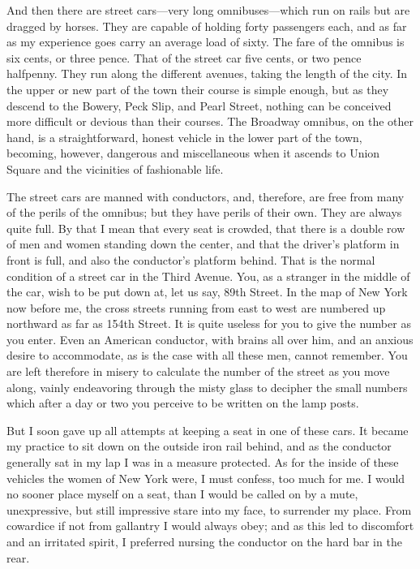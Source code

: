 And then there are street cars---very long omnibuses---which run on
rails but are dragged by horses.  They are capable of holding forty
passengers each, and as far as my experience goes carry an average
load of sixty.  The fare of the omnibus is six cents, or three
pence.  That of the street car five cents, or two pence halfpenny.
They run along the different avenues, taking the length of the
city.  In the upper or new part of the town their course is simple
enough, but as they descend to the Bowery, Peck Slip, and Pearl
Street, nothing can be conceived more difficult or devious than
their courses.  The Broadway omnibus, on the other hand, is a
straightforward, honest vehicle in the lower part of the town,
becoming, however, dangerous and miscellaneous when it ascends to
Union Square and the vicinities of fashionable life.

The street cars are manned with conductors, and, therefore, are
free from many of the perils of the omnibus; but they have perils
of their own.  They are always quite full.  By that I mean that
every seat is crowded, that there is a double row of men and women
standing down the center, and that the driver's platform in front
is full, and also the conductor's platform behind.  That is the
normal condition of a street car in the Third Avenue.  You, as a
stranger in the middle of the car, wish to be put down at, let us
say, 89th Street.  In the map of New York now before me, the cross
streets running from east to west are numbered up northward as far
as 154th Street.  It is quite useless for you to give the number as
you enter.  Even an American conductor, with brains all over him,
and an anxious desire to accommodate, as is the case with all these
men, cannot remember.  You are left therefore in misery to
calculate the number of the street as you move along, vainly
endeavoring through the misty glass to decipher the small numbers
which after a day or two you perceive to be written on the lamp
posts.

But I soon gave up all attempts at keeping a seat in one of these
cars.  It became my practice to sit down on the outside iron rail
behind, and as the conductor generally sat in my lap I was in a
measure protected.  As for the inside of these vehicles the women
of New York were, I must confess, too much for me.  I would no
sooner place myself on a seat, than I would be called on by a mute,
unexpressive, but still impressive stare into my face, to surrender
my place.  From cowardice if not from gallantry I would always
obey; and as this led to discomfort and an irritated spirit, I
preferred nursing the conductor on the hard bar in the rear.

